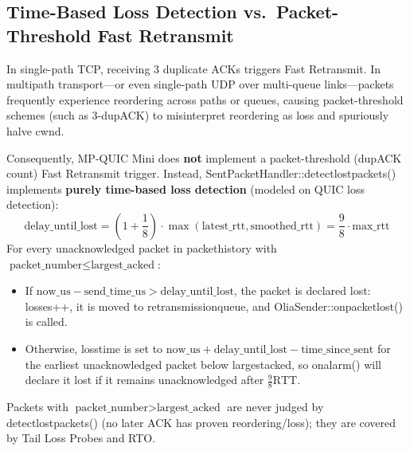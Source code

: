 \documentclass[10pt,a4paper]{article}
\newcommand{\codeul}{\textunderscore\hspace{0pt}}
\DeclareRobustCommand{\code}[1]{{\ttfamily\let\_\codeul #1}}
\begin{document}
\subsection{Time-Based Loss Detection vs.\ Packet-Threshold Fast Retransmit}
In single-path TCP, receiving 3 duplicate ACKs triggers Fast Retransmit. In multipath transport—or even single-path UDP over multi-queue links—packets frequently experience reordering across paths or queues, causing packet-threshold schemes (such as 3-dupACK) to misinterpret reordering as loss and spuriously halve \code{cwnd}.

Consequently, MP-QUIC Mini does \textbf{not} implement a packet-threshold (dupACK count) Fast Retransmit trigger. Instead, \code{SentPacketHandler::detect\_lost\_packets()} implements \textbf{purely time-based loss detection} (modeled on QUIC loss detection):
\begin{equation}
    \text{delay\_until\_lost} = \left(1 + \frac{1}{8}\right) \cdot \max(\text{latest\_rtt}, \text{smoothed\_rtt}) = \frac{9}{8} \cdot \text{max\_rtt}
\end{equation}
For every unacknowledged packet in \code{packet\_history} with $\text{packet\_number} \le \text{largest\_acked}$:
\begin{itemize}
    \item If $\text{now\_us} - \text{send\_time\_us} > \text{delay\_until\_lost}$, the packet is declared lost: \code{losses++}, it is moved to \code{retransmission\_queue}, and \code{OliaSender::on\_packet\_lost()} is called.
    \item Otherwise, \code{loss\_time} is set to $\text{now\_us} + \text{delay\_until\_lost} - \text{time\_since\_sent}$ for the earliest unacknowledged packet below \code{largest\_acked}, so \code{on\_alarm()} will declare it lost if it remains unacknowledged after $\frac{9}{8}\text{RTT}$.
\end{itemize}
Packets with $\text{packet\_number} > \text{largest\_acked}$ are never judged by \code{detect\_lost\_packets()} (no later ACK has proven reordering/loss); they are covered by Tail Loss Probes and RTO.
\end{document}
